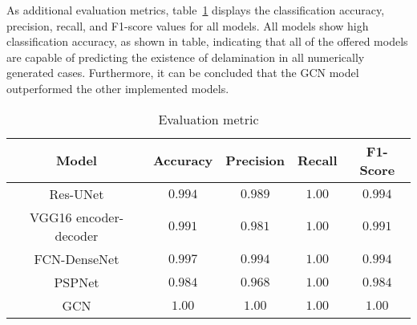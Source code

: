 As additional evaluation metrics, table~\ref{tab:evaluation_metric} displays the classification accuracy, precision, recall, and F1-score values for all models.
All models show high classification accuracy, as shown in table, indicating that all of the offered models are capable of predicting the existence of delamination in all numerically generated cases.
Furthermore, it can be concluded that the GCN model outperformed the other implemented models.
\begin{table}[]
	\centering
	\caption{Evaluation metric}
	\label{tab:evaluation_metric}
	\resizebox{\textwidth}{!}
	{
		\begin{tabular}{ccccc} \hline
			Model& Accuracy & Precision & Recall & F1-Score \\ \hline
			Res-UNet & \(0.994\) & \(0.989\) & \(1.00\) & \(0.994\) \\ 
			VGG16 encoder-decoder & \(0.991\) & \(0.981\) & \(1.00\) & \(0.991\)\\ 
			FCN-DenseNet & \(0.997\) & \(0.994\) & \(1.00\) & \(0.994\) \\ 
			PSPNet & \(0.984\) & \(0.968\) & \(1.00\) & \(0.984\) \\ 
			GCN & \(1.00\) & \(1.00\) & \(1.00\) & \(1.00\) \\ \hline
		\end{tabular}
	}
\end{table}
